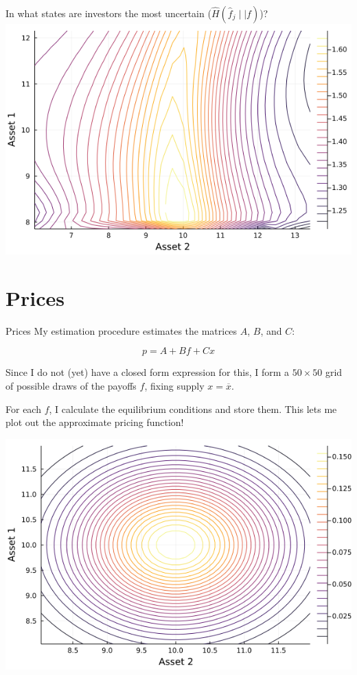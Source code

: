 \documentclass[
  ignorenonframetext,
]{beamer}
\begin{document}
\begin{frame}{In what states are investors the most uncertain
(\(\hat H(\hat f_j \mid\mid f)\))?}
\includegraphics[width=0.4\paperheight]{complexity_files/figure-beamer/unnamed-chunk-20-4}
\end{frame}

\hypertarget{prices-2}{%
\section{Prices}\label{prices-2}}

\begin{frame}{Prices}
\protect\hypertarget{prices-3}{}
My estimation procedure estimates the matrices \(A\), \(B\), and \(C\):

\[
p = A + B f + C x
\]

Since I do not (yet) have a closed form expression for this, I form a
\(50 \times 50\) grid of possible draws of the payoffs \(f\), fixing
supply \(x = \overline x\).

For each \(f\), I calculate the equilibrium conditions and store them.
This lets me plot out the approximate pricing function!
\end{frame}

\begin{frame}{}
\protect\hypertarget{section}{}
\begin{center}\includegraphics[width=0.95\paperheight]{complexity_files/figure-beamer/unnamed-chunk-21-1} \end{center}
\end{frame}
\end{document}
